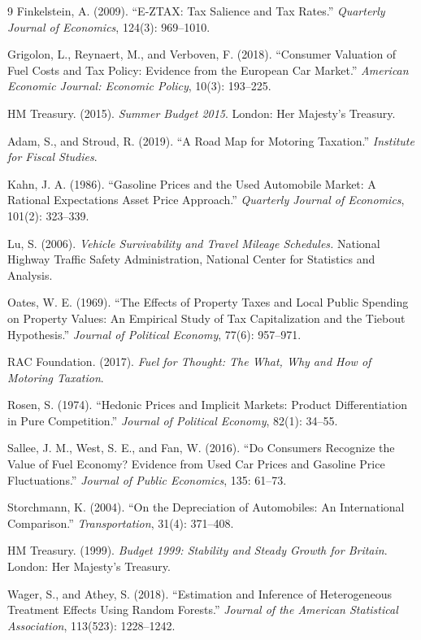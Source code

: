 \documentclass[12pt, a4paper]{article}
\begin{document}
\begin{thebibliography}{9}
Finkelstein, A. (2009).
``E-ZTAX: Tax Salience and Tax Rates.''
\textit{Quarterly Journal of Economics}, 124(3): 969--1010.

Grigolon, L., Reynaert, M., and Verboven, F. (2018).
``Consumer Valuation of Fuel Costs and Tax Policy: Evidence from the European Car Market.''
\textit{American Economic Journal: Economic Policy}, 10(3): 193--225.

HM Treasury. (2015).
\textit{Summer Budget 2015}.
London: Her Majesty's Treasury.

Adam, S., and Stroud, R. (2019).
``A Road Map for Motoring Taxation.''
\textit{Institute for Fiscal Studies}.

Kahn, J. A. (1986).
``Gasoline Prices and the Used Automobile Market: A Rational Expectations Asset Price Approach.''
\textit{Quarterly Journal of Economics}, 101(2): 323--339.

Lu, S. (2006).
\textit{Vehicle Survivability and Travel Mileage Schedules.}
National Highway Traffic Safety Administration, National Center for Statistics and Analysis.

Oates, W. E. (1969).
``The Effects of Property Taxes and Local Public Spending on Property Values: An Empirical Study of Tax Capitalization and the Tiebout Hypothesis.''
\textit{Journal of Political Economy}, 77(6): 957--971.

RAC Foundation. (2017).
\textit{Fuel for Thought: The What, Why and How of Motoring Taxation}.

Rosen, S. (1974).
``Hedonic Prices and Implicit Markets: Product Differentiation in Pure Competition.''
\textit{Journal of Political Economy}, 82(1): 34--55.

Sallee, J. M., West, S. E., and Fan, W. (2016).
``Do Consumers Recognize the Value of Fuel Economy? Evidence from Used Car Prices and Gasoline Price Fluctuations.''
\textit{Journal of Public Economics}, 135: 61--73.

Storchmann, K. (2004).
``On the Depreciation of Automobiles: An International Comparison.''
\textit{Transportation}, 31(4): 371--408.

HM Treasury. (1999).
\textit{Budget 1999: Stability and Steady Growth for Britain}.
London: Her Majesty’s Treasury.

Wager, S., and Athey, S. (2018).
``Estimation and Inference of Heterogeneous Treatment Effects Using Random Forests.''
\textit{Journal of the American Statistical Association}, 113(523): 1228--1242.



\end{thebibliography}
\end{document}
